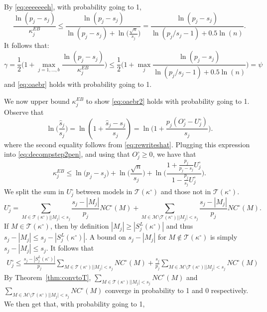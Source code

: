 \documentclass[bj,authoryear]{imsart}
\theoremstyle{plain}
\newcommand{\M}{\mathcal{M}}
\newcommand{\T}{\mathcal{T}}
\begin{document}
By \eqref{eq:eeeeeeeh}, with probability going to 1,
$$ \frac{\ln(p_j-s_j)}{\kappa^{EB}_j}
    \leq \frac{\ln(p_j-s_j)}{\ln(p_j-s_j)+\ln\Big(\frac{\sqrt{n}}{s_j}\Big)} =  \frac{\ln(p_j-s_j)}{\ln(p_j/s_j-1)+0.5\ln(n)} .$$
It follows that:
\begin{equation*}
    \gamma=\frac12\Big(1+\max_{j=1, \ldots,b}\frac{\ln(p_j-s_j)}{\kappa^{EB}_j}\Big) \leq \frac12\Big(1+\max_j \frac{\ln(p_j-s_j)}{\ln(p_j/s_j-1)+0.5\ln(n)}\Big)=\psi
\end{equation*}
and \eqref{eq:oaebr} holds with probability going to 1.

We now upper bound $\kappa^{EB}_j$ to show \eqref{eq:oaebr2} holds with probability going to 1. Observe that 
$$
\ln\Big(\frac{\widehat{s}_j}{s_j}\Big)=
 \ln \left( 1 + \frac{\hat{s}_j - s_j}{s_j}\right) =   
\ln\Big(1+\frac{p_j(O^{\circ}_j-U^{\circ}_j)}{s_j}\Big).
$$
where the second equality follows from \eqref{eq:rewriteshat}.
Plugging this expression into \eqref{eq:decompstep2pen}, and using that $O_j^{\circ} \geq 0$, we have that  %
\begin{equation}\label{eq:gggggggg}
    \kappa^{EB}_j \leq \ln\big(p_j-s_j\big)+\ln\Big(\frac{\sqrt{n}}{s_j}\Big)+\ln\bigg(\frac{1+\frac{p_j}{p_j-s_j}U^{\circ}_j}{1-\frac{p_j}{s_j}U^{\circ}_j}\bigg).
\end{equation}
We split the sum in $U^{\circ}_j$ between models in $\T(\kappa^{\circ})$ and those not in $\T(\kappa^{\circ})$. 
$$U_j^{\circ} = \sum_{M \in \T(\kappa^{\circ}) | |M_j| < s_j}\frac{s_j-|M_j|}{p_j}NC^{\circ}(M)+\sum_{M \in \M\setminus\T(\kappa^{\circ}) | |M_j| < s_j}\frac{s_j-|M_j|}{p_j}NC^{\circ}(M).
$$
If $M\in \T(\kappa^{\circ})$, then by definition $|M_j|\geq |S^{L}_j(\kappa^{\circ})|$ and thus $s_j-|M_j|\leq s_j-|S^{L}_j(\kappa^{\circ})|$. A bound on $s_j-|M_j|$ for $M\not\in \T(\kappa^{\circ})$ is simply $s_j-|M_j|\leq s_j$. It follows that
\begin{eqnarray*}
    U^{\circ}_j \leq \frac{s_j-|S^{L}_j(\kappa^{\circ})|}{p_j}\sum_{M \in \T(\kappa^{\circ}) | |M_j| < s_j}NC^{\circ}(M)+  \frac{s_j}{p_j}\sum_{M \in \M \setminus \T(\kappa^{\circ})| |M_j| < s_j}NC^{\circ}(M)
\end{eqnarray*}
By Theorem~\ref{thm:convtoT}, $\sum_{M \in  \T(\kappa^{\circ})| |M_j| < s_j}NC^{\circ}(M)$ and $\sum_{M \in \M \setminus \T(\kappa^{\circ})| |M_j| < s_j}NC^{\circ}(M)$ converge in probability to 1 and 0 respectively. We then get that, with probability going to 1,
\end{document}
